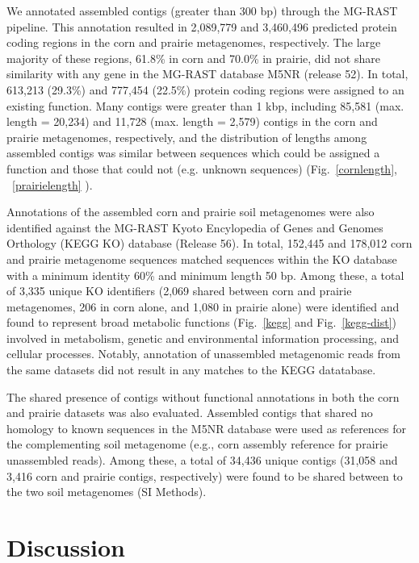 \documentclass{pnastwo}
\begin{document}
\begin{article}
We annotated assembled contigs (greater than 300 bp) through the MG-RAST
pipeline. This annotation resulted in 2,089,779 and 3,460,496 predicted protein
coding regions in the corn and prairie metagenomes, respectively. The large
majority of these regions, 61.8\% in corn and 70.0\% in prairie, did not share similarity with any gene in the MG-RAST
database M5NR (release 52). In total,
613,213 (29.3\%) and 777,454 (22.5\%) protein coding regions were assigned to an
existing function. Many contigs were greater than 1 kbp, including 85,581 (max.
length = 20,234) and 11,728 (max. length = 2,579) contigs in the corn and
prairie metagenomes, respectively, and the distribution of lengths among
assembled contigs was similar between sequences which could be assigned a
function and those that could not (e.g. unknown sequences) (Fig.~\ref{cornlength}, ~\ref{prairielength}
).

Annotations of the assembled corn and prairie soil metagenomes
were also identified against the MG-RAST Kyoto Encylopedia of Genes and Genomes
Orthology (KEGG KO) database (Release 56). In total, 152,445 and 178,012 corn
and prairie metagenome sequences matched sequences within the KO database with a
minimum identity 60\% and minimum length 50 bp. Among these, a total of 3,335
unique KO identifiers (2,069 shared between corn and prairie metagenomes, 206 in
corn alone, and 1,080 in prairie alone) were identified and found to represent
broad metabolic functions (Fig.~\ref{kegg} and Fig.~\ref{kegg-dist}) involved in
metabolism, genetic and environmental information processing, and cellular
processes. Notably, annotation of unassembled metagenomic reads from the same
datasets did not result in any matches to the KEGG datatabase. 


The shared presence of contigs without functional annotations in both the corn
and prairie datasets was also evaluated. Assembled contigs that shared no
homology to known sequences in the M5NR database were used as references for the
complementing soil metagenome (e.g., corn assembly reference for prairie
unassembled reads). Among these, a total of 34,436 unique contigs (31,058 and 3,416 corn and prairie contigs, respectively) were found to be shared between to the two soil metagenomes (SI Methods). 

\section*{Discussion}

\end{article}
\end{document}
